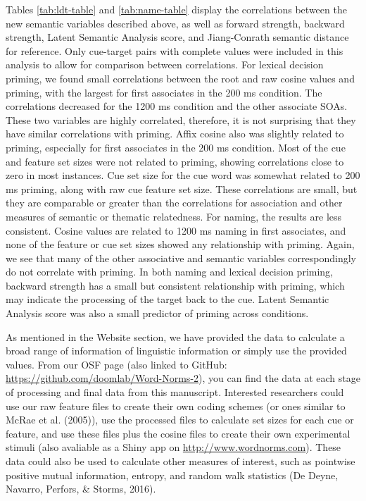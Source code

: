 \documentclass[english,,man]{apa6}
\theoremstyle{definition}
\theoremstyle{definition}
\theoremstyle{definition}
\theoremstyle{remark}
\begin{document}
Tables \ref{tab:ldt-table} and \ref{tab:name-table} display the
correlations between the new semantic variables described above, as well
as forward strength, backward strength, Latent Semantic Analysis score,
and Jiang-Conrath semantic distance for reference. Only cue-target pairs
with complete values were included in this analysis to allow for
comparison between correlations. For lexical decision priming, we found
small correlations between the root and raw cosine values and priming,
with the largest for first associates in the 200 ms condition. The
correlations decreased for the 1200 ms condition and the other associate
SOAs. These two variables are highly correlated, therefore, it is not
surprising that they have similar correlations with priming. Affix
cosine also was slightly related to priming, especially for first
associates in the 200 ms condition. Most of the cue and feature set
sizes were not related to priming, showing correlations close to zero in
most instances. Cue set size for the cue word was somewhat related to
200 ms priming, along with raw cue feature set size. These correlations
are small, but they are comparable or greater than the correlations for
association and other measures of semantic or thematic relatedness. For
naming, the results are less consistent. Cosine values are related to
1200 ms naming in first associates, and none of the feature or cue set
sizes showed any relationship with priming. Again, we see that many of
the other associative and semantic variables correspondingly do not
correlate with priming. In both naming and lexical decision priming,
backward strength has a small but consistent relationship with priming,
which may indicate the processing of the target back to the cue. Latent
Semantic Analysis score was also a small predictor of priming across
conditions.

As mentioned in the Website section, we have provided the data to
calculate a broad range of information of linguistic information or
simply use the provided values. From our OSF page (also linked to
GitHub: \url{https://github.com/doomlab/Word-Norms-2}), you can find the
data at each stage of processing and final data from this manuscript.
Interested researchers could use our raw feature files to create their
own coding schemes (or ones similar to McRae et al. (2005)), use the
processed files to calculate set sizes for each cue or feature, and use
these files plus the cosine files to create their own experimental
stimuli (also avaliable as a Shiny app on
\url{http://www.wordnorms.com}). These data could also be used to
calculate other measures of interest, such as pointwise positive mutual
information, entropy, and random walk statistics (De Deyne, Navarro,
Perfors, \& Storms, 2016).
\end{document}
